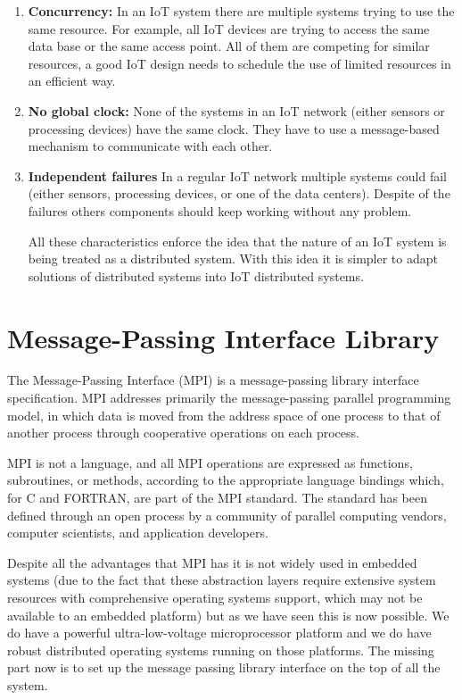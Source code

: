 \begin{enumerate}
\item \textbf{Concurrency:}
In an IoT system there are multiple systems trying to use the same resource.
For example, all IoT devices are trying to access the same data base or
the same access point. All of them are competing for similar resources, a
good IoT design needs to schedule the use of limited resources in an efficient
way.

\item \textbf{No global clock:}
None of the systems in an IoT network (either sensors or processing devices)
have the same clock. They have to use a message-based mechanism to communicate
with each other. 

\item \textbf{Independent failures}
In a regular IoT network multiple systems could fail (either sensors,
processing devices, or one of the data centers). Despite of the failures others
components should keep working without any problem.

All these characteristics enforce the idea that the nature of an IoT system is
being treated as a distributed system. With this idea it is simpler to adapt
solutions of distributed systems into IoT distributed systems.

\end{enumerate}

\section{Message-Passing Interface Library}
\noindent

The Message-Passing Interface (MPI) is a message-passing library interface
specification. MPI addresses primarily the message-passing parallel programming
model, in which data is moved from the address space of one process to that of
another process through cooperative operations on each process.

MPI is not a language, and all MPI operations are expressed as functions,
subroutines, or methods, according to the appropriate language bindings which,
for C and FORTRAN, are part of the MPI standard. The standard has been defined
through an open process by a community of parallel computing vendors, computer
scientists, and application developers.

Despite all the advantages that MPI has it is not widely used in embedded
systems (due to the fact that these abstraction layers require extensive
system resources with comprehensive operating systems support, which may not be
available to an embedded platform) but as we have seen this is now possible. We
do have a powerful ultra-low-voltage microprocessor platform
\cite{minnowboard} and we do have robust distributed operating systems running on
those platforms. The missing part now is to set up the message passing library
interface on the top of all the system. 

